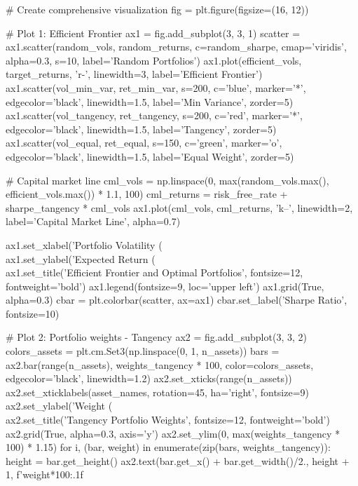 \documentclass[a4paper, 11pt]{article}
\begin{document}
\begin{pycode}
# Create comprehensive visualization
fig = plt.figure(figsize=(16, 12))

# Plot 1: Efficient Frontier
ax1 = fig.add_subplot(3, 3, 1)
scatter = ax1.scatter(random_vols, random_returns, c=random_sharpe, cmap='viridis',
                     alpha=0.3, s=10, label='Random Portfolios')
ax1.plot(efficient_vols, target_returns, 'r-', linewidth=3, label='Efficient Frontier')
ax1.scatter(vol_min_var, ret_min_var, s=200, c='blue', marker='*',
           edgecolor='black', linewidth=1.5, label='Min Variance', zorder=5)
ax1.scatter(vol_tangency, ret_tangency, s=200, c='red', marker='*',
           edgecolor='black', linewidth=1.5, label='Tangency', zorder=5)
ax1.scatter(vol_equal, ret_equal, s=150, c='green', marker='o',
           edgecolor='black', linewidth=1.5, label='Equal Weight', zorder=5)

# Capital market line
cml_vols = np.linspace(0, max(random_vols.max(), efficient_vols.max()) * 1.1, 100)
cml_returns = risk_free_rate + sharpe_tangency * cml_vols
ax1.plot(cml_vols, cml_returns, 'k--', linewidth=2, label='Capital Market Line', alpha=0.7)

ax1.set_xlabel('Portfolio Volatility (\\%
ax1.set_ylabel('Expected Return (\\%
ax1.set_title('Efficient Frontier and Optimal Portfolios', fontsize=12, fontweight='bold')
ax1.legend(fontsize=9, loc='upper left')
ax1.grid(True, alpha=0.3)
cbar = plt.colorbar(scatter, ax=ax1)
cbar.set_label('Sharpe Ratio', fontsize=10)

# Plot 2: Portfolio weights - Tangency
ax2 = fig.add_subplot(3, 3, 2)
colors_assets = plt.cm.Set3(np.linspace(0, 1, n_assets))
bars = ax2.bar(range(n_assets), weights_tangency * 100, color=colors_assets,
              edgecolor='black', linewidth=1.2)
ax2.set_xticks(range(n_assets))
ax2.set_xticklabels(asset_names, rotation=45, ha='right', fontsize=9)
ax2.set_ylabel('Weight (\\%
ax2.set_title('Tangency Portfolio Weights', fontsize=12, fontweight='bold')
ax2.grid(True, alpha=0.3, axis='y')
ax2.set_ylim(0, max(weights_tangency * 100) * 1.15)
for i, (bar, weight) in enumerate(zip(bars, weights_tangency)):
    height = bar.get_height()
    ax2.text(bar.get_x() + bar.get_width()/2., height + 1,
            f'{weight*100:.1f}\\%


\end{pycode}
\end{document}
